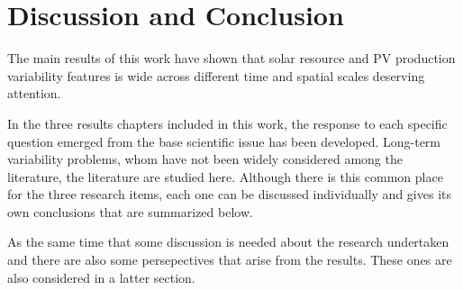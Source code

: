 


\chapter{Discussion and Conclusion\label{Conclusion}}

The main results of this work have shown that solar resource and PV production variability features is wide across different time and spatial scales deserving attention.  

In the three results chapters included in this work, the response to each specific question emerged from the base scientific issue has been developed. Long-term variability problems, whom have not been widely considered among the literature, the literature are studied here. Although there is this common place for the three research items, each one can be discussed individually and gives its own conclusions that are summarized below.

As the same time that some discussion is needed about the research undertaken and there are also some persepectives that arise from the results. These ones are also considered in a latter section.



